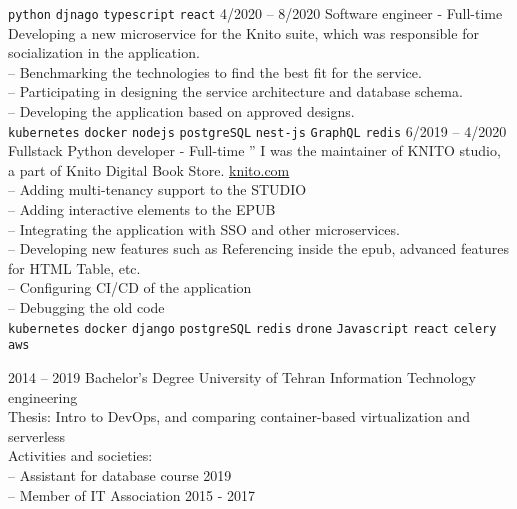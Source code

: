 \documentclass[9pt]{developercv}
\begin{document}
\begin{entrylist}
{		\texttt{python}\slashsep
		\texttt{djnago}\slashsep
		\texttt{typescript}\slashsep
		\texttt{react}\slashsep
	}
	\entry
	{4/2020 -- 8/2020}
	{Software engineer - Full-time}
	{}
	{
		Developing a new microservice for the Knito suite, which was responsible for socialization in the application.\\
		-- Benchmarking the technologies to find the best fit for the service. \\
		-- Participating in designing the service architecture and database schema. \\
		-- Developing the application based on approved designs. \\
		\texttt{kubernetes}\slashsep
		\texttt{docker}\slashsep
		\texttt{nodejs}\slashsep
		\texttt{postgreSQL}\slashsep
		\texttt{nest-js}\slashsep
		\texttt{GraphQL}\slashsep
		\texttt{redis}\slashsep
	}
	\entry
	{6/2019 -- 4/2020}
	{Fullstack Python developer - Full-time}
	{''}
	{
		I was the maintainer of KNITO studio, a part of Knito Digital Book Store.
		\href{https://knito.com/}{knito.com} \\
		-- Adding multi-tenancy support to the STUDIO \\
		-- Adding interactive elements to the EPUB \\
		-- Integrating the application with SSO and other microservices. \\
		-- Developing new features such as Referencing inside the epub, advanced features for HTML Table, etc. \\
		-- Configuring CI/CD of the application \\
		-- Debugging the old code \\
		\texttt{kubernetes}\slashsep
		\texttt{docker}\slashsep
		\texttt{django}\slashsep
		\texttt{postgreSQL}\slashsep
		\texttt{redis}\slashsep
		\texttt{drone}\slashsep
		\texttt{Javascript}\slashsep
		\texttt{react}\slashsep
		\texttt{celery}\slashsep
		\texttt{aws}\slashsep
	}
\end{entrylist}

\begin{entrylist}
	\entry
	{2014 -- 2019}
	{Bachelor's Degree}
	{University of Tehran}
	{
		Information Technology engineering \\
		Thesis: Intro to DevOps, and comparing container-based virtualization and serverless \\
		Activities and societies: \\
		-- Assistant for database course 2019 \\
		-- Member of IT Association 2015 - 2017 \\
	}
\end{entrylist}
\end{document}
